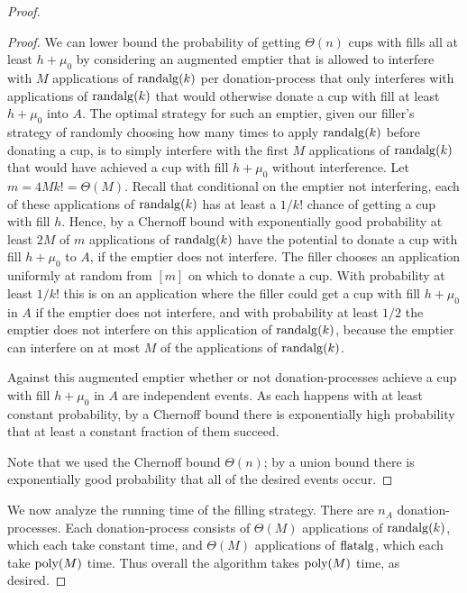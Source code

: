 \begin{proof}
\begin{proof}
  We can lower bound the probability of getting $\Theta(n)$ cups
  with fills all at least $h + \mu_0$ by considering an augmented emptier
  that is allowed to interfere with $M$ applications of $\operatorname{\text{\textup{randalg}}}(k)$
  per donation-process that only interferes with applications of
  $\operatorname{\text{\textup{randalg}}}(k)$ that would otherwise donate a cup with fill at
  least $h + \mu_0$ into $A$. 
  The optimal strategy for such an emptier, given our filler's
  strategy of randomly choosing how many times to apply
  $\operatorname{\text{\textup{randalg}}}(k)$ before donating a cup, is to simply interfere with the first $M$ applications of
  $\operatorname{\text{\textup{randalg}}}(k)$ that would have achieved a cup
  with fill $h+\mu_0$ without interference. 
  Let $m = 4M k! = \Theta(M)$. Recall that conditional on
  the emptier not interfering, each of these applications of
  $\operatorname{\text{\textup{randalg}}}(k)$ has at least a $1/k!$ chance of getting a cup with
  fill $h$. Hence, by a Chernoff bound with exponentially good
  probability at least $2M$ of $m$ applications of $\operatorname{\text{\textup{randalg}}}(k)$ have
  the potential to donate a cup with fill $h+\mu_0$ to $A$, if the
  emptier does not interfere. The filler chooses an application
  uniformly at random from $[m]$ on which to donate a cup.
  With probability at least $1/k!$ this is on an
  application where the filler could get a cup with fill
  $h+\mu_0$ in $A$ if the emptier does not interfere, and with probability at
  least $1/2$ the emptier does not interfere on this application
  of $\operatorname{\text{\textup{randalg}}}(k)$, because the emptier can interfere on at most $M$
  of the applications of $\operatorname{\text{\textup{randalg}}}(k)$. 

  Against this augmented emptier whether or not 
  donation-processes achieve a cup with fill $h+\mu_0$ in $A$ are
  independent events. As each happens with at least constant
  probability, by a Chernoff bound there is exponentially high
  probability that at least a constant fraction of them succeed.

  Note that we used the Chernoff bound $\Theta(n)$; by a union
  bound there is exponentially good probability that all of the
  desired events occur.

\end{proof}

We now analyze the running time of the filling strategy.
There are $n_A$ donation-processes. Each donation-process
consists of $\Theta(M)$ applications of $\operatorname{\text{\textup{randalg}}}(k)$, which each take
constant time, and $\Theta(M)$
applications of $\operatorname{\text{\textup{flatalg}}}$, which each take $\operatorname{\text{poly}}(M)$ time.
Thus overall the algorithm takes $\operatorname{\text{poly}}(M)$ time, as desired.
  
\end{proof}

